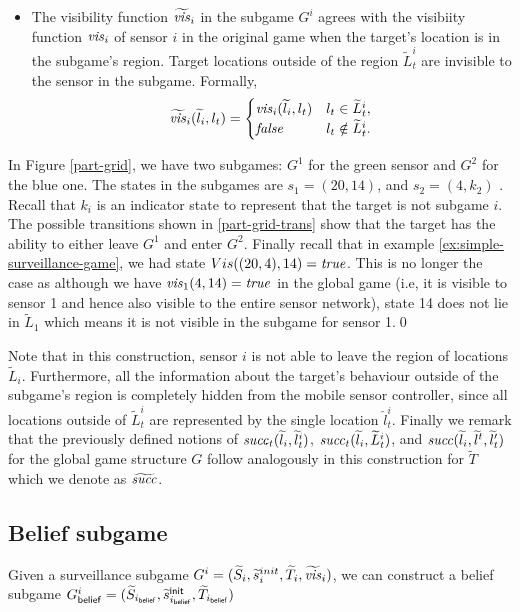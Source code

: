 \begin{itemize}
  \item The visibility function $\widetilde{\mathit{vis}}_i$ in the subgame $G^i$ agrees with the visibiity function $\mathit{vis}_i$ of sensor $i$ in the original game when the target's location is in the subgame's region. Target locations outside of the region $\widetilde L_t^i$ are invisible to the sensor in the subgame. Formally, 
 \[\widetilde{\mathit{vis}}_i(\widetilde{l}_i,l_t) = \begin{cases}
\mathit{vis}_i(\widetilde{l}_i,l_t) & l_t \in \widetilde{L}_t^i, \\
\mathit{false} & l_t \notin \widetilde{L}_t^i.
\end{cases}
\]
\end{itemize}
\begin{example}
In Figure \ref{part-grid}, we have two subgames: $G^1$ for the green sensor and $G^2$ for the blue one. The states in the subgames are $s_1 = (20,14)$, and $s_2 = (4,k_2)$ . Recall that $k_i$ is an indicator state to represent that the target is not subgame $i$. The possible transitions shown in \ref{part-grid-trans} show that the target has the ability to either leave $G^1$ and enter $G^2$. Finally recall that in example \ref{ex:simple-surveillance-game}, we had state $Vis((20,4),14) = \mathit{true}$. This is no longer the case as although we have $\mathit{vis}_1(4,14) = \mathit{true}$ in the global game (i.e, it is visible to sensor 1 and hence also visible to the entire sensor network), state 14 does not lie in $\widetilde{L}_1$ which means it is not visible in the subgame for sensor 1.\qed
\end{example}

Note that in this construction, sensor $i$ is not able to leave the region of locations $\widetilde{L}_i$. Furthermore, all the information about the target's behaviour outside of  the subgame's region is completely hidden from the mobile sensor controller, since all locations outside of  $\widetilde{L}_t^i$ are represented by the single location $\hat{l}_t^i$.
Finally we remark that the previously defined notions of $\mathit{succ}_t(\widetilde{l}_i,\widetilde{l}^i_{t})$, $\mathit{succ}_t(\widetilde{l}_i,\widetilde{L}^i_{t})$, and $\mathit{succ}(\widetilde{l}_i,\widetilde{l}^{t},\widetilde{l}_{t}')$ for the global game structure $G$ follow analogously in this construction for $\widetilde{T}$ which we denote as $\widetilde{\mathit{succ}}$.

\subsection{Belief subgame}
Given a surveillance subgame $G^{i} = (\widetilde{S}_i,\widetilde{s}_i^{init},\widetilde{T}_i,\widetilde{\mathit{vis}}_i)$, we can construct a belief subgame $G^{i}_{\mathsf{belief}} = (\widetilde{S}_{i_{\mathsf{belief}}},\widetilde{s}^{\mathsf{init}}_{i_{\mathsf{belief}}},\widetilde{T}_{i_{\mathsf{belief}}})$ 


